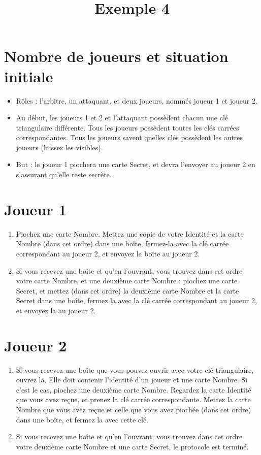 \documentclass[a4paper,10pt]{article}
\title{Exemple 4}
\date{}
\begin{document}
\maketitle

\section{Nombre de joueurs et situation initiale}
\begin{itemize}
	\item Rôles : l'arbitre, un attaquant, et deux joueurs, nommés joueur 1 et joueur 2.
	\item Au début, les joueurs 1 et 2 et l'attaquant possèdent chacun une clé triangulaire différente. Tous les joueurs possèdent toutes les clés carrées correspondantes. Tous les joueurs savent quelles clés possèdent les autres joueurs (laissez les visibles).
	\item But : le joueur 1 piochera une carte Secret, et devra l'envoyer au joueur 2 en s'assurant qu'elle reste secrète.
\end{itemize}




\section{Joueur 1}
\begin{enumerate}
	\item Piochez une carte Nombre. Mettez une copie de votre Identité et la carte Nombre (dans cet ordre) dans une boîte, fermez-la avec la clé carrée correspondant au joueur 2, et envoyez la boîte au joueur 2.
	\item Si vous recevez une boîte et qu'en l'ouvrant, vous trouvez dans cet ordre votre carte Nombre, et une deuxième carte Nombre : piochez une carte Secret, et mettez (dans cet ordre) la deuxième carte Nombre et la carte Secret dans une boîte, fermez la avec la clé carrée correspondant au joueur 2, et envoyez la au joueur 2.
\end{enumerate}

\section{Joueur 2}
\begin{enumerate}
	\item Si vous recevez une boîte que vous pouvez ouvrir avec votre clé triangulaire, ouvrez la. Elle doit contenir l'identité d'un joueur et une carte Nombre. Si c'est le cas, piochez une deuxième carte Nombre. Regardez la carte Identité que vous avez reçue, et prenez la clé carrée correspondante. Mettez la carte Nombre que vous avez reçue et celle que vous avez piochée (dans cet ordre) dans une boîte, et fermez la avec cette clé.
	\item Si vous recevez une boîte et qu'en l'ouvrant, vous trouvez dans cet ordre votre deuxième carte Nombre et une carte Secret, le protocole est terminé.
\end{enumerate}
\end{document}
